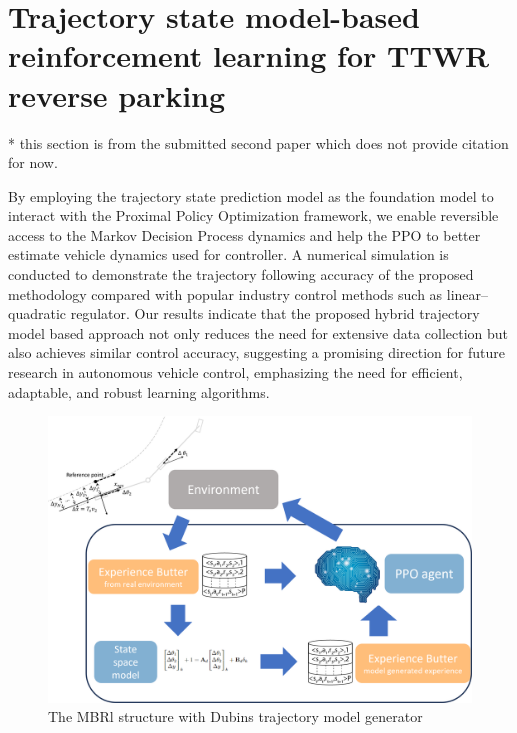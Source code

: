 \section{Trajectory state model-based reinforcement learning for TTWR reverse parking}
\label{section: Trajectory state model-based reinforcement learning for TTWR reverse parking}

* this section is from the submitted second paper which does not provide citation for now.

By employing the trajectory state prediction model as the foundation model to interact with the Proximal Policy Optimization framework, we enable reversible access to the Markov Decision Process dynamics and help the PPO to better estimate vehicle dynamics used for controller. A numerical simulation is conducted to demonstrate the trajectory following accuracy of the proposed methodology compared with popular industry control methods such as linear–quadratic regulator. Our results indicate that the proposed hybrid trajectory model based approach not only reduces the need for extensive data collection but also achieves similar control accuracy, suggesting a promising direction for future research in autonomous vehicle control, emphasizing the need for efficient, adaptable, and robust learning algorithms.

\begin{figure}[h]
    \centering
    \includegraphics[width=0.8\linewidth]{fig/known mbrl schema.png}
    \caption{The MBRl structure with Dubins trajectory model generator}
    \label{fig: The MBRl structure with Dubins trajectory model generator}
\end{figure}


